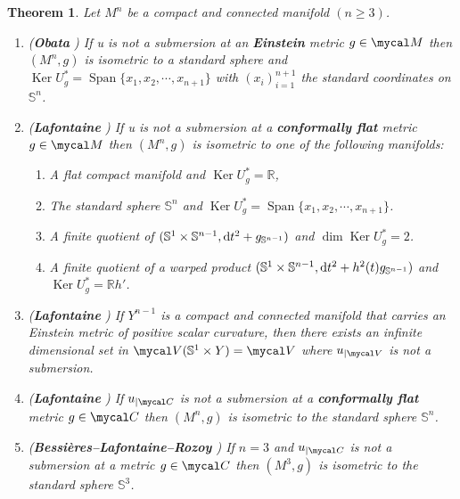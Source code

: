 \documentclass[a4paper,11pt,leqno]{amsart}
\numberwithin{equation}{section}
\theoremstyle{main}
\newtheorem{thm} {\bf  Theorem} [section]
\begin{document}
\begin{thm} Let $M^n$  be a compact and connected manifold $(n\ge 3)$.
\begin{enumerate}
	\item (\textbf{Obata} \cite{O}) If u is not a submersion at an \textbf{Einstein} metric $g\in\mycal M$ then $(M^n,g)$ is isometric to a standard sphere and ${\operatorname{Ker}} U^*_g={\operatorname{Span}}\{x_1,x_2,\cdots, x_{n+1}\}$ with $(x_i)^{n+1}_{i=1}$ the standard coordinates on ${{\mathbb S^{n}}}$.
	\item (\textbf{Lafontaine} \cite{L}) If u is not a submersion at a \textbf{conformally flat} metric $g\in\mycal M$ then $(M^n,g)$ is isometric to one of the following manifolds:
\begin{enumerate}
	\item [1)] A flat compact manifold and ${\operatorname{Ker}} U^*_g= {{\mathbb R}}$,
	\item [2)] The standard sphere ${{\mathbb S^{n}}}$ and ${\operatorname{Ker}} U^*_g={\operatorname{Span}}\{x_1,x_2,\cdots, x_{n+1}\}$.
	\item [3)] A finite quotient of $(\mathbb S^1 \times\mathbb S^{n-1}, {{\rm d}} t^2 + g_{\mathbb S^{n-1}})$ and $\dim{\operatorname{Ker}} U^*_g=2$.
	\item [4)] A finite quotient of a warped product $(\mathbb S^1 \times\mathbb S^{n-1}, {{\rm d}} t^2 +h^2(t) g_{\mathbb S^{n-1}})$ and ${{\operatorname{Ker}} U^*_g={{\mathbb R}} h'}$.
\end{enumerate}
	\item (\textbf{Lafontaine} \cite{L}) If $Y^{n-1}$ is  a compact and connected manifold that carries an Einstein metric of positive scalar curvature, then there exists an infinite dimensional set in $\mycal V(\mathbb S^1\times Y)=\mycal V$ where $u_{|\mycal V}$ is not a submersion. 
	\item (\textbf{Lafontaine} \cite{L}) If $u_{|\mycal C}$ is not a submersion at a \textbf{conformally flat} metric $g\in \mycal C$ then $(M^n,g)$ is isometric to the standard sphere $\mathbb S^n$.
	\item (\textbf{Bessières--Lafontaine--Rozoy} \cite{BLR}) If $n=3$ and $u_{|\mycal C}$ is not a submersion at a metric $g\in \mycal C$ then $(M^3,g)$ is isometric to the standard sphere $\mathbb S^3$.
\end{enumerate}
\end{thm}
\end{document}
